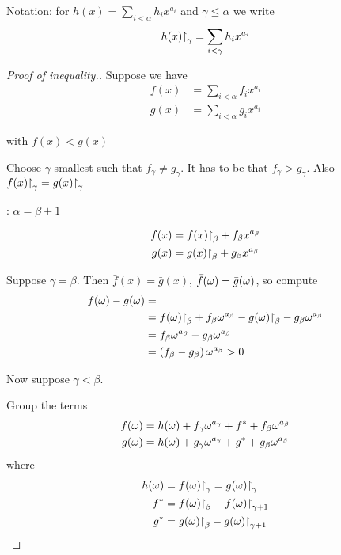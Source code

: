 Notation: for $h(x) = \sum_{i < \alpha} h_i x^{a_i}$ and $\gamma \leq \alpha$ we write
\begin{align*}
	h(x)\mathord{\upharpoonright}_{\gamma} = \sum_{i < \gamma} h_i x^{a_i}
\end{align*}

\begin{proof}[Proof of inequality.] %
	Suppose we have
	\begin{align*}
		f(x) &= \sum_{i < \alpha} f_i x^{a_i} \\
		g(x) &= \sum_{i < \alpha} g_i x^{a_i}
	\end{align*}

	with $f(x) < g(x)$

	Choose $\gamma$ smallest such that $f_\gamma \neq g_\gamma$.
	It has to be that $f_\gamma > g_\gamma$. Also $f(x)\mathord{\upharpoonright}_{\gamma} = g(x)\mathord{\upharpoonright}_{\gamma}$

	: $\alpha = \beta + 1$

	\begin{align*}
		f(x) &= f(x)\mathord{\upharpoonright}_{\beta} + f_\beta x^{a_\beta}\\
		g(x) &= g(x)\mathord{\upharpoonright}_{\beta} + g_\beta x^{a_\beta}
	\end{align*}

	Suppose $\gamma = \beta$.
	Then $\bar f(x) = \bar g(x)$, $\bar f(\omega) = \bar g(\omega)$, so compute
	\begin{align*}
		f(\omega) - g(\omega) &= \\
		&= f(\omega)\mathord{\upharpoonright}_{\beta} + f_\beta \omega^{a_\beta} - g(\omega)\mathord{\upharpoonright}_{\beta} - g_\beta \omega^{a_\beta} \\
		&= f_\beta \omega^{a_\beta} - g_\beta \omega^{a_\beta} \\
		&= \left( f_\beta - g_\beta \right) \omega^{a_\beta} > 0
	\end{align*}

	Now suppose $\gamma < \beta$.

	Group the terms
	\begin{align*}
		f(\omega) &= h(\omega) + f_\gamma \omega^{a_\gamma} + f^* + f_\beta \omega^{a_\beta} \\
		g(\omega) &= h(\omega) + g_\gamma \omega^{a_\gamma} + g^* + g_\beta \omega^{a_\beta}
	\end{align*}
	where
	\begin{align*}
		h(\omega) &= f(\omega)\mathord{\upharpoonright}_{\gamma} = g(\omega)\mathord{\upharpoonright}_{\gamma} \\
		f^* &= f(\omega)\mathord{\upharpoonright}_{\beta} - f(\omega)\mathord{\upharpoonright}_{\gamma + 1} \\
		g^* &= g(\omega)\mathord{\upharpoonright}_{\beta} - g(\omega)\mathord{\upharpoonright}_{\gamma + 1}
	\end{align*}


\end{proof}
